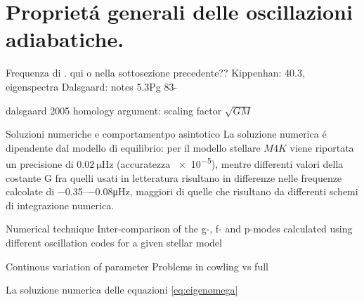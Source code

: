 \section{Propriet\'a generali delle oscillazioni adiabatiche.}

\begin{todo}{Frequenza di \bv{}.}
qui o nella sottosezione precedente??
Kippenhan: 40.3, eigenspectra
Dalsgaard: notes 5.3Pg 83-
\end{todo}

\begin{comment}
\begin{figure}[!ht]
\centering
\texttt{[image: propagationAG]}
\caption{Regioni di propagazione.}
\end{figure}
\end{comment}

\begin{todo}{dalsgaard 2005}
homology argument: scaling factor $\sqrt{GM}$
\end{todo}


\begin{todo}{Soluzioni numeriche e comportamentpo asintotico}
La soluzione numerica \'e dipendente dal modello di equilibrio: per il modello stellare $M4K$ viene riportata un precisione di $\SI{0.02}{\micro\hertz}$ (accuratezza \num{e-5}), mentre differenti valori della costante G fra quelli usati in letteratura risultano in differenze nelle frequenze calcolate di \numrange{-0.35}{-0.08}\si{\micro\hertz}, maggiori di quelle che risultano da differenti schemi di integrazione numerica.
\end{todo}

\begin{todo}{Numerical technique}
Inter-comparison of the g-, f- and p-modes calculated using different oscillation codes for a given stellar model

\end{todo}

\begin{todo}{Continous variation of parameter}
Problems in cowling vs full
\end{todo}

La soluzione numerica delle equazioni \eqref{eq:eigenomega}


\begin{comment}
\begin{figure}[!ht]
\centering
\texttt{[image: omega-l]}
\caption{Modi di oscillazion. plot omega vs l..}
\end{figure}
\end{comment}

